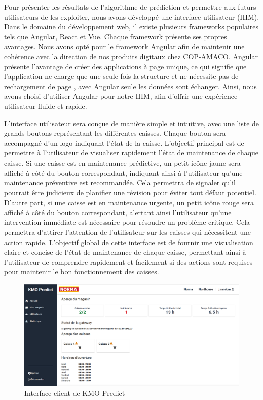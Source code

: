 \documentclass[12pt]{article}
\begin{document}
\justify
\text Pour présenter les résultats de l'algorithme de prédiction et permettre aux futurs utilisateurs de les exploiter, nous avons développé une interface utilisateur (IHM). Dans le domaine du développement web, il existe plusieurs frameworks populaires tels que Angular, React et Vue. Chaque framework présente ses propres avantages. Nous avons opté pour le framework Angular afin de maintenir une cohérence avec la direction de nos produits digitaux chez COP-AMACO. Angular présente l'avantage de créer des applications à page unique, ce qui signifie que l'application ne charge que une seule fois la structure et ne nécessite pas de rechargement de page , avec Angular seule les données sont échanger. Ainsi, nous avons choisi d'utiliser Angular pour notre IHM, afin d'offrir une expérience utilisateur fluide et rapide.  

\justify
\text L'interface utilisateur sera conçue de manière simple et intuitive, avec une liste de grands boutons représentant les différentes caisses. Chaque bouton sera accompagné d'un logo indiquant l'état de la caisse. L'objectif principal est de permettre à l'utilisateur de visualiser rapidement l'état de maintenance de chaque caisse.
Si une caisse est en maintenance prédictive, un petit icône jaune sera affiché à côté du bouton correspondant, indiquant ainsi à l'utilisateur qu'une maintenance préventive est recommandée. Cela permettra de signaler qu'il pourrait être judicieux de planifier une révision pour éviter tout défaut potentiel.
D'autre part, si une caisse est en maintenance urgente, un petit icône rouge sera affiché à côté du bouton correspondant, alertant ainsi l'utilisateur qu'une intervention immédiate est nécessaire pour résoudre un problème critique. Cela permettra d'attirer l'attention de l'utilisateur sur les caisses qui nécessitent une action rapide.
L'objectif global de cette interface est de fournir une visualisation claire et concise de l'état de maintenance de chaque caisse, permettant ainsi à l'utilisateur de comprendre rapidement et facilement si des actions sont requises pour maintenir le bon fonctionnement des caisses.


\centering
\begin{figure}[H]
    \centering
    \includegraphics[width=\textwidth]{img/interface_client_predict.png}
    \caption{Interface client de KMO Predict}
    \label{fig:enter-label}
\end{figure}
 
\end{document}
